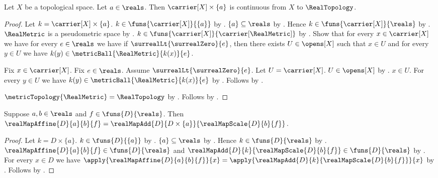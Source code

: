 \begin{theorem}\label{real_constant_graph_continuous}
    Let $X$ be a topological space.
    Let $a\in\reals$.
    Then $\carrier[X]\times\{a\}$ is continuous from $X$ to
        $\RealTopology$.
\end{theorem}
\begin{proof}
    Let $k=\carrier[X]\times\{a\}$.
    $k\in\funs{\carrier[X]}{\{a\}}$ by .
    $\{a\}\subseteq\reals$
        by .
    Hence $k\in\funs{\carrier[X]}{\reals}$
        by .
    $\RealMetric$ is a pseudometric space by
        .
    $k\in\funs{\carrier[X]}{\carrier[\RealMetric]}$
        by .
    Show that for every $x\in\carrier[X]$ we have
        for every $e\in\reals$ we have if
            $\surrealLt{\surrealZero}{e}$, then there exists
            $U\in\opens[X]$ such that $x\in U$ and
            for every $y\in U$ we have
                $k(y)\in\metricBall{\RealMetric}{k(x)}{e}$.
    \begin{subproof}
        Fix $x\in\carrier[X]$.
        Fix $e\in\reals$.
        Assume $\surrealLt{\surrealZero}{e}$.
        Let $U=\carrier[X]$.
        $U\in\opens[X]$ by .
        $x\in U$.
        For every $y\in U$ we have
            $k(y)\in\metricBall{\RealMetric}{k(x)}{e}$
            by
            .
        Follows by \auto.
    \end{subproof}
    $\metricTopology{\RealMetric}=\RealTopology$
        by .
    Follows by .
\end{proof}

\begin{proposition}\label{real_map_affine_eq_add_constant_scale}
    Suppose $a,b\in\reals$ and $f\in\funs{D}{\reals}$.
    Then
        $\realMapAffine{D}{a}{b}{f}=
            \realMapAdd{D}{D\times\{a\}}{\realMapScale{D}{b}{f}}$.
\end{proposition}
\begin{proof}
    Let $k=D\times\{a\}$.
    $k\in\funs{D}{\{a\}}$ by .
    $\{a\}\subseteq\reals$ by .
    Hence $k\in\funs{D}{\reals}$ by .
    $\realMapAffine{D}{a}{b}{f}\in\funs{D}{\reals}$ and
        $\realMapAdd{D}{k}{\realMapScale{D}{b}{f}}\in\funs{D}{\reals}$
        by
        .
    For every $x\in D$ we have
        $\apply{\realMapAffine{D}{a}{b}{f}}{x}=
            \apply{\realMapAdd{D}{k}{\realMapScale{D}{b}{f}}}{x}$
        by
        .
    Follows by .
\end{proof}

